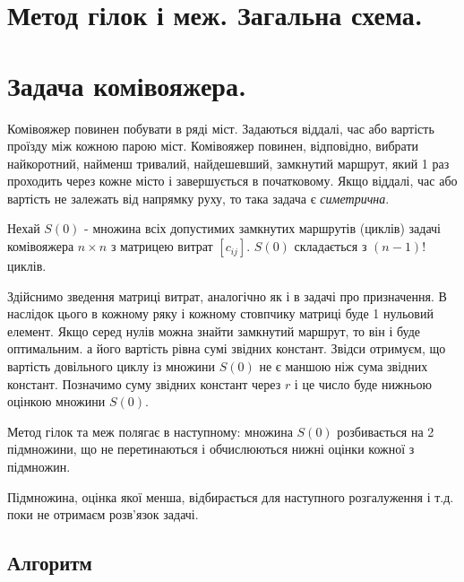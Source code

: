\documentclass[12pt,a4paper]{report}
\begin{document}
\clearpage

\chapter{Метод гілок і меж. Загальна схема.}

\clearpage

\chapter{Задача комівояжера.}

Комівояжер повинен побувати в ряді міст. Задаються віддалі, час або вартість проїзду між кожною парою міст. Комівояжер повинен, відповідно, вибрати найкоротний, найменш тривалий, найдешевший, замкнутий маршрут, який 1 раз проходить через кожне місто і завершується в початковому. Якщо віддалі, час або вартість не залежать від напрямку руху, то така задача є \emph{симетрична}.

Нехай $S(0)$ - множина всіх допустимих замкнутих маршрутів (циклів) задачі комівояжера $n \times n$ з матрицею витрат $[c_{ij}]$. $S(0)$ складається з $(n-1)!$ циклів.

Здійснимо зведення матриці витрат, аналогічно як і в задачі про призначення. В наслідок цього в кожному ряку і кожному стовпчику матриці буде 1 нульовий елемент. Якщо серед нулів можна знайти замкнутий маршрут, то він і буде оптимальним. а його вартість рівна сумі звідних констант. Звідси отримуєм, що вартість довільного циклу із множини $S(0)$ не є маншою ніж сума звідних констант. Позначимо суму звідних констант через $r$ і це число буде нижньою оцінкою множини $S(0)$.

Метод гілок та меж полягає в наступному: множина $S(0)$ розбивається на 2 підмножини, що не перетинаються і обчислюються нижні оцінки кожної з підмножин.

Підмножина, оцінка якої менша, відбирається для наступного розгалуження і т.д. поки не отримаєм розв’язок задачі.

\section{Алгоритм}
\end{document}
